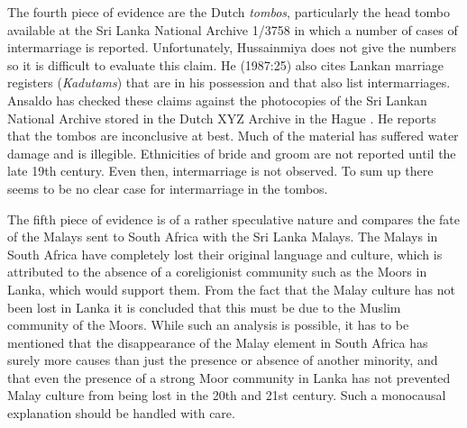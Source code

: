 The fourth piece of evidence are the Dutch \textit{tombos},  particularly the head tombo available at the Sri Lanka National Archive 1/3758 in which  a number of cases of intermarriage is reported. Unfortunately, Hussainmiya does not give the numbers so it is difficult to evaluate this claim. He (1987:25) also cites Lankan marriage registers (\textit{Kadutams}) that are in his possession and that also list intermarriages.
Ansaldo has checked these claims against the photocopies of the Sri Lankan National Archive stored in the Dutch XYZ \kuckn Archive in the Hague \citep{Ansaldo2008genesis}. He reports that the tombos are inconclusive at best. Much of the material has suffered water damage and is illegible. Ethnicities of bride and groom are not reported until the late 19th century. Even then, intermarriage is not observed. To sum up there seems to be no clear case for intermarriage in the tombos.

The fifth piece of evidence is of a rather speculative nature and
compares the fate of the Malays sent to South Africa with the Sri
Lanka Malays. The Malays in South Africa have completely lost
their original language and culture, which is attributed to the
absence of a coreligionist community such as the Moors in Lanka,
which would support them. From the fact that the Malay culture has
not been lost in Lanka it is concluded that this must be due to
the Muslim community of the Moors. While such an analysis is
possible, it has to be mentioned that the disappearance of the
Malay element in South Africa has surely more causes than just the
presence or absence of another minority, and that even the
presence of a strong Moor community in Lanka has not prevented
Malay culture from being lost in the 20th and 21st century. Such a
monocausal explanation should be handled with care.


